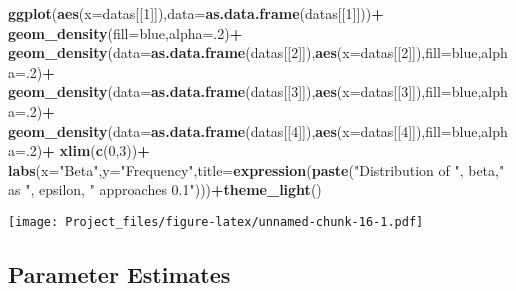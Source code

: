 \documentclass[
]{article}
\newenvironment{Shaded}{\begin{snugshade}}{\end{snugshade}}
\newcommand{\AttributeTok}[1]{\textcolor[rgb]{0.13,0.29,0.53}{#1}}
\newcommand{\DecValTok}[1]{\textcolor[rgb]{0.00,0.00,0.81}{#1}}
\newcommand{\FunctionTok}[1]{\textcolor[rgb]{0.13,0.29,0.53}{\textbf{#1}}}
\newcommand{\NormalTok}[1]{#1}
\newcommand{\SpecialCharTok}[1]{\textcolor[rgb]{0.81,0.36,0.00}{\textbf{#1}}}
\newcommand{\StringTok}[1]{\textcolor[rgb]{0.31,0.60,0.02}{#1}}
\begin{document}
\begin{Shaded}
\begin{Highlighting}[]
\FunctionTok{ggplot}\NormalTok{(}\FunctionTok{aes}\NormalTok{(}\AttributeTok{x=}\NormalTok{datas[[}\DecValTok{1}\NormalTok{]]),}\AttributeTok{data=}\FunctionTok{as.data.frame}\NormalTok{(datas[[}\DecValTok{1}\NormalTok{]]))}\SpecialCharTok{+}
  \FunctionTok{geom\_density}\NormalTok{(}\AttributeTok{fill=}\StringTok{\textquotesingle{}blue\textquotesingle{}}\NormalTok{,}\AttributeTok{alpha=}\NormalTok{.}\DecValTok{2}\NormalTok{)}\SpecialCharTok{+}
  \FunctionTok{geom\_density}\NormalTok{(}\AttributeTok{data=}\FunctionTok{as.data.frame}\NormalTok{(datas[[}\DecValTok{2}\NormalTok{]]),}\FunctionTok{aes}\NormalTok{(}\AttributeTok{x=}\NormalTok{datas[[}\DecValTok{2}\NormalTok{]]),}\AttributeTok{fill=}\StringTok{\textquotesingle{}blue\textquotesingle{}}\NormalTok{,}\AttributeTok{alpha=}\NormalTok{.}\DecValTok{2}\NormalTok{)}\SpecialCharTok{+}
  \FunctionTok{geom\_density}\NormalTok{(}\AttributeTok{data=}\FunctionTok{as.data.frame}\NormalTok{(datas[[}\DecValTok{3}\NormalTok{]]),}\FunctionTok{aes}\NormalTok{(}\AttributeTok{x=}\NormalTok{datas[[}\DecValTok{3}\NormalTok{]]),}\AttributeTok{fill=}\StringTok{\textquotesingle{}blue\textquotesingle{}}\NormalTok{,}\AttributeTok{alpha=}\NormalTok{.}\DecValTok{2}\NormalTok{)}\SpecialCharTok{+}
  \FunctionTok{geom\_density}\NormalTok{(}\AttributeTok{data=}\FunctionTok{as.data.frame}\NormalTok{(datas[[}\DecValTok{4}\NormalTok{]]),}\FunctionTok{aes}\NormalTok{(}\AttributeTok{x=}\NormalTok{datas[[}\DecValTok{4}\NormalTok{]]),}\AttributeTok{fill=}\StringTok{\textquotesingle{}blue\textquotesingle{}}\NormalTok{,}\AttributeTok{alpha=}\NormalTok{.}\DecValTok{2}\NormalTok{)}\SpecialCharTok{+}
  \FunctionTok{xlim}\NormalTok{(}\FunctionTok{c}\NormalTok{(}\DecValTok{0}\NormalTok{,}\DecValTok{3}\NormalTok{))}\SpecialCharTok{+}
  \FunctionTok{labs}\NormalTok{(}\AttributeTok{x=}\StringTok{"Beta"}\NormalTok{,}\AttributeTok{y=}\StringTok{"Frequency"}\NormalTok{,}\AttributeTok{title=}\FunctionTok{expression}\NormalTok{(}\FunctionTok{paste}\NormalTok{(}\StringTok{"Distribution of "}\NormalTok{, beta,}\StringTok{"  as  "}\NormalTok{, epsilon, }\StringTok{" approaches 0.1"}\NormalTok{)))}\SpecialCharTok{+}\FunctionTok{theme\_light}\NormalTok{()}
\end{Highlighting}
\end{Shaded}

\texttt{[image: Project\_files/figure-latex/unnamed-chunk-16-1.pdf]}

\subsection{Parameter Estimates}\label{parameter-estimates}
\end{document}
